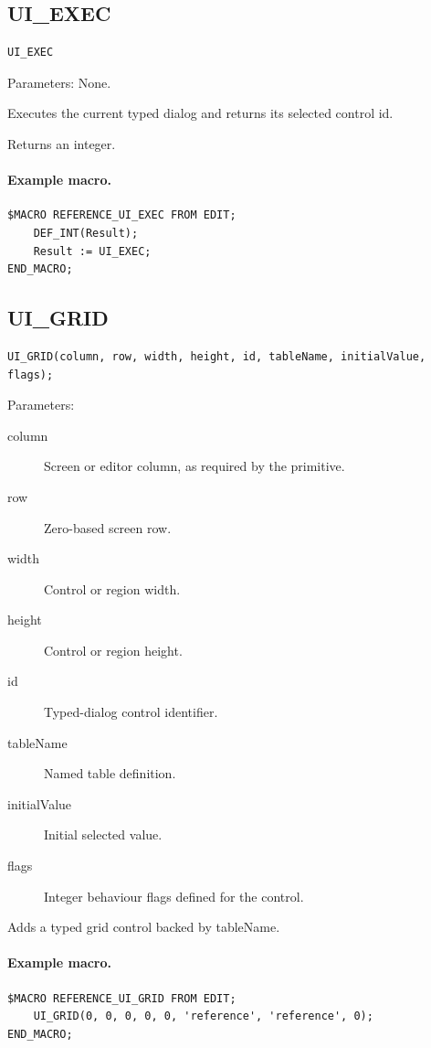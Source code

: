 \documentclass[a4paper,10pt,twoside,openany]{book}
\newenvironment{mrmacextension}{\begin{changebar}}{\end{changebar}}
\begin{document}
\begin{mrmacextension}
\label{prim:intrinsic-ui-exec}
\subsection*{UI\_EXEC}
\begin{verbatim}
UI_EXEC
\end{verbatim}
Parameters: None.

Executes the current typed dialog and returns its selected control id.

Returns an integer.

\paragraph{Example macro.}
\begin{verbatim}
$MACRO REFERENCE_UI_EXEC FROM EDIT;
    DEF_INT(Result);
    Result := UI_EXEC;
END_MACRO;
\end{verbatim}
\end{mrmacextension}

\begin{mrmacextension}
\label{prim:procedure-ui-grid}
\subsection*{UI\_GRID}
\begin{verbatim}
UI_GRID(column, row, width, height, id, tableName, initialValue, flags);
\end{verbatim}
Parameters:
\begin{description}
\item[column] Screen or editor column, as required by the primitive.
\item[row] Zero-based screen row.
\item[width] Control or region width.
\item[height] Control or region height.
\item[id] Typed-dialog control identifier.
\item[tableName] Named table definition.
\item[initialValue] Initial selected value.
\item[flags] Integer behaviour flags defined for the control.
\end{description}

Adds a typed grid control backed by tableName.

\paragraph{Example macro.}
\begin{verbatim}
$MACRO REFERENCE_UI_GRID FROM EDIT;
    UI_GRID(0, 0, 0, 0, 0, 'reference', 'reference', 0);
END_MACRO;
\end{verbatim}
\end{mrmacextension}
\end{document}
